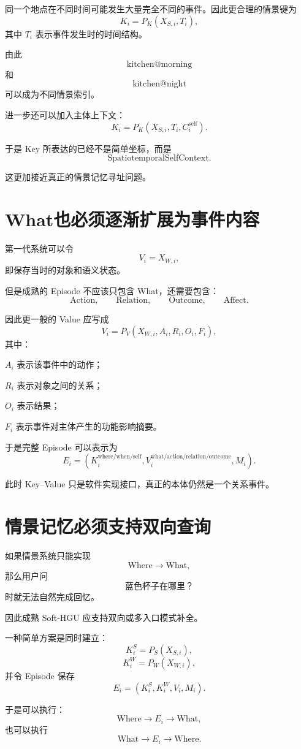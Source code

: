 同一个地点在不同时间可能发生大量完全不同的事件。因此更合理的情景键为
\[
\boxed{
K_i
=
P_K
(
X_{S,i},
T_i
),
}
\]
其中 $T_i$ 表示事件发生时的时间结构。

由此
\[
\mathrm{kitchen@morning}
\]
和
\[
\mathrm{kitchen@night}
\]
可以成为不同情景索引。

进一步还可以加入主体上下文：
\[
\boxed{
K_i
=
P_K
(
X_{S,i},
T_i,
C^{\mathrm{self}}_i
).
}
\]

于是 Key 所表达的已经不是简单坐标，而是
\[
\boxed{
\mathrm{SpatiotemporalSelfContext}.
}
\]

这更加接近真正的情景记忆寻址问题。

\section{What也必须逐渐扩展为事件内容}

第一代系统可以令
\[
V_i=X_{W,i},
\]
即保存当时的对象和语义状态。

但是成熟的 Episode 不应该只包含 What，还需要包含：
\[
\mathrm{Action},
\qquad
\mathrm{Relation},
\qquad
\mathrm{Outcome},
\qquad
\mathrm{Affect}.
\]

因此更一般的 Value 应写成
\[
\boxed{
V_i
=
P_V
(
X_{W,i},
A_i,
R_i,
O_i,
F_i
),
}
\]
其中：

$A_i$ 表示该事件中的动作；

$R_i$ 表示对象之间的关系；

$O_i$ 表示结果；

$F_i$ 表示事件对主体产生的功能影响摘要。

于是完整 Episode 可以表示为
\[
\boxed{
E_i
=
(
K_i^{\mathrm{where/when/self}},
V_i^{\mathrm{what/action/relation/outcome}},
M_i
).
}
\]

此时 Key--Value 只是软件实现接口，真正的本体仍然是一个关系事件。

\section{情景记忆必须支持双向查询}

如果情景系统只能实现
\[
\mathrm{Where}\rightarrow\mathrm{What},
\]
那么用户问
\[
\text{蓝色杯子在哪里？}
\]
时就无法自然完成回忆。

因此成熟 Soft-HGU 应支持双向或多入口模式补全。

一种简单方案是同时建立：
\[
K_i^S=P_S(X_{S,i}),
\]
\[
K_i^W=P_W(X_{W,i}),
\]
并令 Episode 保存
\[
E_i
=
(
K_i^S,
K_i^W,
V_i,
M_i
).
\]

于是可以执行：
\[
\mathrm{Where}
\rightarrow
E_i
\rightarrow
\mathrm{What},
\]
也可以执行
\[
\mathrm{What}
\rightarrow
E_i
\rightarrow
\mathrm{Where}.
\]

